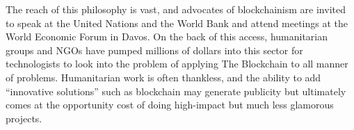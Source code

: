
The reach of this philosophy is vast, and advocates of blockchainism are invited
to speak at the United Nations and the World Bank and attend meetings at the
World Economic Forum in Davos. On the back of this access, humanitarian groups
and NGOs have pumped millions of dollars into this sector for technologists to
look into the problem of applying The Blockchain to all manner of problems.
Humanitarian work is often thankless, and the ability to add ``innovative
solutions'' such as blockchain may generate publicity but ultimately comes at
the opportunity cost of doing high-impact but much less glamorous projects.
